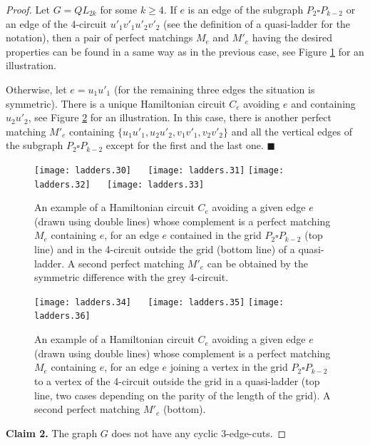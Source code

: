 \documentclass[]{theclass}
\begin{document}
\begin{proof}
Let $G=QL_{2k}$ for some $k\ge 4$. If $e$ is an edge of the subgraph $P_2\square P_{k-2}$ or an edge of the 4-circuit $u'_1v'_1u'_2v'_2$ (see the definition of a quasi-ladder for the notation), then a pair of perfect matchings $M_e$ and $M'_e$ having the desired properties can be found in a same way as in the previous case, see Figure \ref{fig:quasiladder} for an illustration. 

Otherwise, let $e=u_1u'_1$ (for the remaining three edges the situation is symmetric). There is a unique Hamiltonian circuit $C_e$ avoiding $e$ and containing $u_2u'_2$, see Figure \ref{fig:quasiladder2} for an illustration. In this case, there is another perfect matching $M'_e$ containing $\{u_1u'_1,u_2u'_2,v_1v'_1,v_2v'_2\}$ and all the vertical edges of the subgraph $P_2\square P_{k-2}$ except for the first and the last one. \hfill {\tiny$\blacksquare$}\\

\begin{figure}[ht]
    \centering
    \texttt{[image: ladders.30]} $\quad$
    \texttt{[image: ladders.31]}
    \texttt{[image: ladders.32]} $\quad$
    \texttt{[image: ladders.33]}
    \caption{An example of a Hamiltonian circuit $C_e$ avoiding a given edge $e$ (drawn using double lines) whose complement is a perfect matching $M_e$ containing $e$, for an edge $e$ contained in the grid $P_2\square P_{k-2}$ (top line) and in the 4-circuit outside the grid (bottom line) of a quasi-ladder. A second perfect matching $M'_e$ can be obtained by the symmetric difference with the grey 4-circuit. }
    \label{fig:quasiladder}
\end{figure}


\begin{figure}[ht]
    \centering
    \texttt{[image: ladders.34]} $\quad$
    \texttt{[image: ladders.35]}
    \texttt{[image: ladders.36]} $\quad$
    
    \caption{An example of a Hamiltonian circuit $C_e$ avoiding a given edge $e$ (drawn using double lines) whose complement is a perfect matching $M_e$ containing $e$, for an edge $e$ joining a vertex in the grid $P_2\square P_{k-2}$ to a vertex of the 4-circuit outside the grid in a quasi-ladder (top line, two cases depending on the parity of the length of the grid). A second perfect matching $M'_e$ (bottom). }
    \label{fig:quasiladder2}
\end{figure}

\noindent\textbf{Claim 2.} The graph $G$ does not have any cyclic 3-edge-cuts.


\end{proof}
\end{document}
